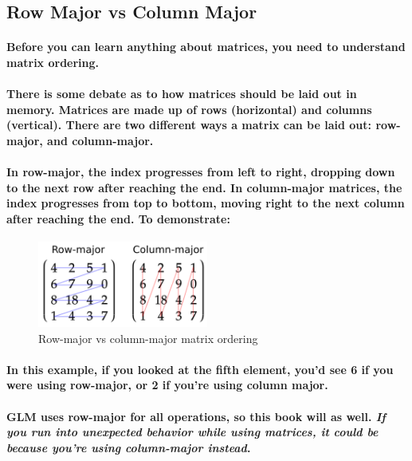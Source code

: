 \subsection{\textsf{Row Major vs Column Major}}
\paragraph{
    Before you can learn anything about matrices, you need to understand matrix ordering.
}

\paragraph{
    There is some debate as to how matrices should be laid out in memory. Matrices are made up of rows (horizontal) and columns (vertical). There are two different ways a matrix can be laid out: row-major, and column-major.
}

\paragraph{
    In row-major, the index progresses from left to right, dropping down to the next row after reaching the end. In column-major matrices, the index progresses from top to bottom, moving right to the next column after reaching the end. To demonstrate:
}

\begin{frame}{}
    \begin{figure}[ht]
      \centering
      \includegraphics[width=0.5\textwidth]{images/chap2/RowVsColumn.png}
      \caption{Row-major vs column-major matrix ordering}
      \label{fig:row_vs_column}
    \end{figure}
\end{frame}

\paragraph{
    In this example, if you looked at the fifth element, you'd see 6 if you were using row-major, or 2 if you're using column major.
}

\paragraph{
    GLM uses row-major for all operations, so this book will as well. \emph{If you run into unexpected behavior while using matrices, it could be because you're using column-major instead}.
}

